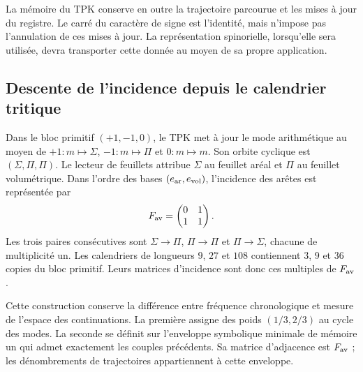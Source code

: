 La mémoire du TPK conserve en outre la trajectoire parcourue et les mises à jour du registre. Le carré du caractère de signe est l'identité, mais n'impose pas l'annulation de ces mises à jour. La représentation spinorielle, lorsqu'elle sera utilisée, devra transporter cette donnée au moyen de sa propre application.

\subsection{Descente de l’incidence depuis le calendrier tritique}

Dans le bloc primitif $(+1,-1,0)$, le TPK met à jour le mode arithmétique au moyen de
$+1:m\mapsto\Sigma$, $-1:m\mapsto\Pi$ et $0:m\mapsto m$. Son orbite cyclique
est $(\Sigma,\Pi,\Pi)$. Le lecteur de feuillets attribue $\Sigma$ au feuillet aréal et
$\Pi$ au feuillet volumétrique. Dans l’ordre des bases $(e_{\rm ar},e_{\rm vol})$,
l’incidence des arêtes est représentée par
\begin{equation}
 F_{\rm av}=\begin{pmatrix}0&1\\1&1\end{pmatrix}.
 \label{iii:eq:fav}
\end{equation}
Les trois paires consécutives sont $\Sigma\to\Pi$, $\Pi\to\Pi$ et $\Pi\to\Sigma$, chacune de multiplicité un. Les calendriers de longueurs $9$, $27$ et $108$ contiennent $3$, $9$ et $36$ copies du bloc primitif. Leurs matrices d'incidence sont donc ces multiples de $F_{\rm av}$.

Cette construction conserve la différence entre fréquence chronologique et mesure
de l’espace des continuations. La première assigne des poids $(1/3,2/3)$ au cycle
des modes. La seconde se définit sur l’enveloppe symbolique minimale de mémoire
un qui admet exactement les couples précédents. Sa matrice d’adjacence est
$F_{\rm av}$ ; les dénombrements de trajectoires appartiennent à cette enveloppe.

